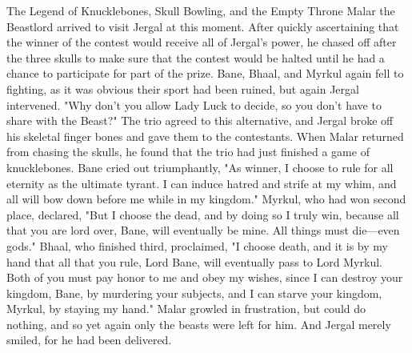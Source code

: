 \documentclass[10pt,a4paper,twoside,twocolumn,openany,bg=print,nodeprecatedcode]{dndbook}
\begin{document}
\begin{DndComment}{The Legend of Knucklebones, Skull Bowling, and the Empty Throne}
Malar the Beastlord arrived to visit Jergal at this moment. After quickly ascertaining that the winner of the contest would receive all of Jergal's power, he chased off after the three skulls to make sure that the contest would be halted until he had a chance to participate for part of the prize. Bane, Bhaal, and Myrkul again fell to fighting, as it was obvious their sport had been ruined, but again Jergal intervened. "Why don't you allow Lady Luck to decide, so you don't have to share with the Beast?"
The trio agreed to this alternative, and Jergal broke off his skeletal finger bones and gave them to the contestants. When Malar returned from chasing the skulls, he found that the trio had just finished a game of knucklebones.
Bane cried out triumphantly, "As winner, I choose to rule for all eternity as the ultimate tyrant. I can induce hatred and strife at my whim, and all will bow down before me while in my kingdom."
Myrkul, who had won second place, declared, "But I choose the dead, and by doing so I truly win, because all that you are lord over, Bane, will eventually be mine. All things must die—even gods."
Bhaal, who finished third, proclaimed, "I choose death, and it is by my hand that all that you rule, Lord Bane, will eventually pass to Lord Myrkul. Both of you must pay honor to me and obey my wishes, since I can destroy your kingdom, Bane, by murdering your subjects, and I can starve your kingdom, Myrkul, by staying my hand."
Malar growled in frustration, but could do nothing, and so yet again only the beasts were left for him.
And Jergal merely smiled, for he had been delivered.
\end{DndComment}
\end{document}
